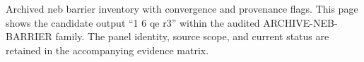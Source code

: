 Archived neb barrier inventory with convergence and provenance flags. This page shows the candidate output ``1 6 qe r3'' within the audited ARCHIVE-NEB-BARRIER family. The panel identity, source scope, and current status are retained in the accompanying evidence matrix.
